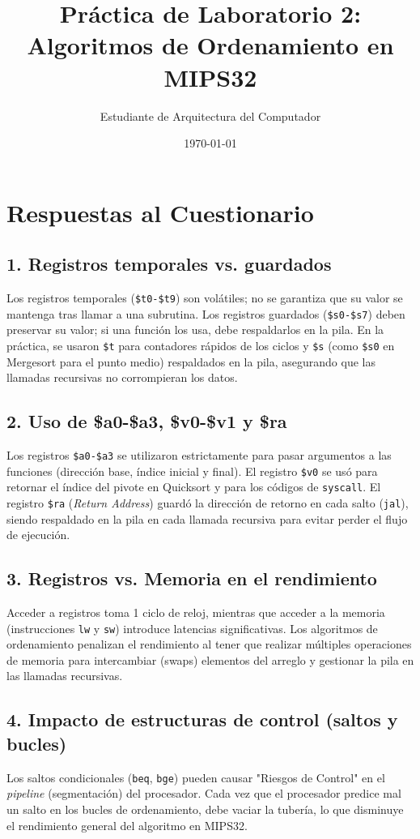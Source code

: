 \documentclass[12pt, a4paper]{article}
\title{Práctica de Laboratorio 2: Algoritmos de Ordenamiento en MIPS32}
\author{Estudiante de Arquitectura del Computador}
\date{\today}
\begin{document}
\maketitle

\section{Respuestas al Cuestionario}

\subsection{1. Registros temporales vs. guardados}
Los registros temporales (\texttt{\$t0-\$t9}) son volátiles; no se garantiza que su valor se mantenga tras llamar a una subrutina. Los registros guardados (\texttt{\$s0-\$s7}) deben preservar su valor; si una función los usa, debe respaldarlos en la pila. En la práctica, se usaron \texttt{\$t} para contadores rápidos de los ciclos y \texttt{\$s} (como \texttt{\$s0} en Mergesort para el punto medio) respaldados en la pila, asegurando que las llamadas recursivas no corrompieran los datos.

\subsection{2. Uso de \$a0-\$a3, \$v0-\$v1 y \$ra}
Los registros \texttt{\$a0-\$a3} se utilizaron estrictamente para pasar argumentos a las funciones (dirección base, índice inicial y final). El registro \texttt{\$v0} se usó para retornar el índice del pivote en Quicksort y para los códigos de \texttt{syscall}. El registro \texttt{\$ra} (\textit{Return Address}) guardó la dirección de retorno en cada salto (\texttt{jal}), siendo respaldado en la pila en cada llamada recursiva para evitar perder el flujo de ejecución.

\subsection{3. Registros vs. Memoria en el rendimiento}
Acceder a registros toma 1 ciclo de reloj, mientras que acceder a la memoria (instrucciones \texttt{lw} y \texttt{sw}) introduce latencias significativas. Los algoritmos de ordenamiento penalizan el rendimiento al tener que realizar múltiples operaciones de memoria para intercambiar (swaps) elementos del arreglo y gestionar la pila en las llamadas recursivas.

\subsection{4. Impacto de estructuras de control (saltos y bucles)}
Los saltos condicionales (\texttt{beq}, \texttt{bge}) pueden causar "Riesgos de Control" en el \textit{pipeline} (segmentación) del procesador. Cada vez que el procesador predice mal un salto en los bucles de ordenamiento, debe vaciar la tubería, lo que disminuye el rendimiento general del algoritmo en MIPS32.
\end{document}
